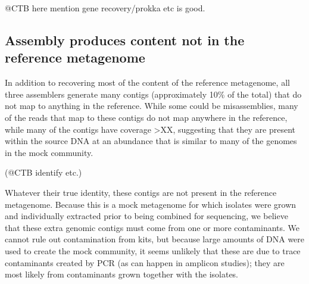 \documentclass[10pt,a4paper,twocolumn]{article}
\begin{document}



@CTB here mention gene recovery/prokka etc is good.


\subsection*{Assembly produces content not in the reference metagenome}

In addition to recovering most of the content of the reference
metagenome, all three assemblers generate many contigs (approximately
10\% of the total) that do not map to anything in the reference.
While some could be misassemblies, many of the reads that map to these
contigs do not map anywhere in the reference, while many of the
contigs have coverage >XX, suggesting that they are present within the
source DNA at an abundance that is similar to many of the genomes in
the mock community.

(@CTB identify etc.)


Whatever their true identity, these contigs are not present in the
reference metagenome. Because this is a mock metagenome for which
isolates were grown and individually extracted prior to being combined
for sequencing, we believe that these extra genomic contigs must come
from one or more contaminants.  We cannot rule out contamination from
kits, but because large amounts of DNA were used to create the mock
community, it seems unlikely that these are due to trace contaminants
created by PCR (as can happen in amplicon studies); they are most
likely from contaminants grown together with the isolates.
\end{document}
